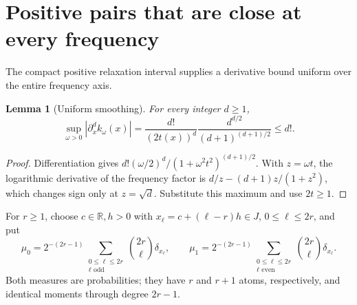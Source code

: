 \documentclass[10pt]{amsart}
\newtheorem{lemma}[theorem]{Lemma}
\theoremstyle{definition}
\theoremstyle{remark}
\newcommand{\R}{\mathbb R}
\begin{document}
\section{Positive pairs that are close at every frequency}\label{sec:pair}
The compact positive relaxation interval supplies a derivative bound uniform over the entire frequency axis.
\begin{lemma}[Uniform smoothing]\label{lem:derivative}
For every integer $d\ge1$,
\begin{equation}\label{eq:derivative}
 \sup_{\omega>0}|\partial_x^dk_\omega(x)|
 =\frac{d!}{(2t(x))^d}\frac{d^{d/2}}{(d+1)^{(d+1)/2}}
 \le d!.
\end{equation}
\end{lemma}
\begin{proof}
Differentiation gives $d!(\omega/2)^d/(1+\omega^2t^2)^{(d+1)/2}$. With $z=\omega t$, the logarithmic derivative of the frequency factor is $d/z-(d+1)z/(1+z^2)$, which changes sign only at $z=\sqrt d$. Substitute this maximum and use $2t\ge1$.
\end{proof}

For $r\ge1$, choose $c\in\R,h>0$ with $x_\ell=c+(\ell-r)h\in J$, $0\le\ell\le2r$, and put
\begin{equation}\label{eq:pair}
 \mu_0=2^{-(2r-1)}\sum_{\substack{0\le\ell\le2r\\\ell\text{ odd}}}\binom{2r}{\ell}\delta_{x_\ell},
 \qquad
 \mu_1=2^{-(2r-1)}\sum_{\substack{0\le\ell\le2r\\\ell\text{ even}}}\binom{2r}{\ell}\delta_{x_\ell}.
\end{equation}
Both measures are probabilities; they have $r$ and $r+1$ atoms, respectively, and identical moments through degree $2r-1$.
\end{document}
